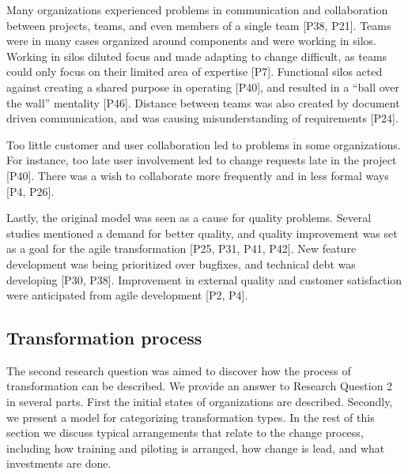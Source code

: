 \documentclass[preprint,authoryear,12pt]{elsarticle}
\begin{document}
Many organizations experienced problems in communication and collaboration
between projects, teams, and even members of a single team [P38, P21].
Teams were in many cases organized around components and were working in silos.
Working in silos diluted focus and made adapting to change difficult, as teams
could only focus on their limited area of expertise [P7]. Functional silos acted
against creating a shared purpose in operating [P40], and resulted in a ``ball
over the wall'' mentality [P46]. Distance between teams was also created by
document driven communication, and was causing misunderstanding of requirements
[P24].

Too little customer and user collaboration led to problems in some
organizations. For instance, too late user involvement led to change requests
late in the project [P40]. There was a wish to collaborate more frequently and
in less formal ways [P4, P26].


% 

Lastly, the original model was seen as a cause for quality problems.
Several studies mentioned a demand for better quality, and quality improvement
was set as a goal for the agile transformation [P25, P31, P41, P42]. New feature
development was being prioritized over bugfixes, and technical debt was
developing [P30, P38]. Improvement in external quality and customer satisfaction
were anticipated from agile development [P2, P4].


\clearpage

\subsection{Transformation process}

The second research question was aimed to discover how the process of
transformation can be described.
We provide an answer to Research Question 2 in several parts. First the initial
states of organizations are described. Secondly, we present a model for
categorizing transformation types. In the rest of this section we discuss
typical arrangements that relate to the change process, including how training
and piloting is arranged, how change is lead, and what investments are done.
\end{document}
